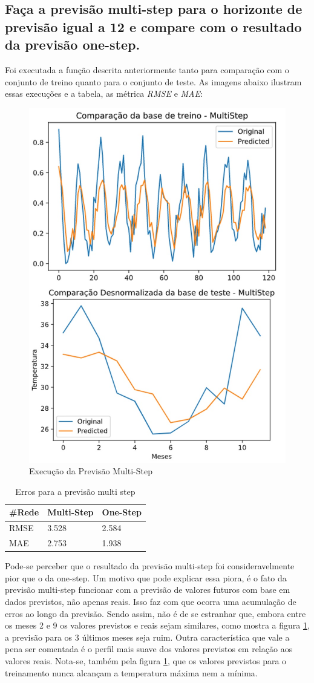 \documentclass[12pt]{article}
\begin{document}
	
	\subsection{Faça a previsão multi-step para o horizonte de previsão igual a 12 e compare com o resultado da previsão one-step.}
	
	Foi executada a função descrita anteriormente tanto para comparação com o conjunto de treino quanto para o conjunto de teste. As imagens abaixo ilustram essas execuções e a tabela, as métrica \textit{RMSE} e \textit{MAE}:
	\begin{figure}[H]
		\centering
		\includegraphics[width=0.5\linewidth]{Imagens/multistep/compMulti.jpg}
		\caption{Execução da Previsão Multi-Step}
		\label{fig:compmulti}
	\end{figure}
	\begin{table}[H]\label{tab:multiErros}
		\begin{tabular}{|l|l|l|}
			\hline
			\#Rede & Multi-Step & One-Step \\ \hline
			RMSE   & 3.528    & 2.584 \\ \hline
			MAE    &  2.753   & 1.938  \\ \hline
		\end{tabular}
		\centering
		\caption{Erros para a previsão multi step}
	\end{table}

	Pode-se perceber que o resultado da previsão multi-step foi consideravelmente pior que o da one-step. Um motivo que pode explicar essa piora, é o fato da previsão multi-step funcionar com a previsão de valores futuros com base em dados previstos, não apenas reais. Isso faz com que ocorra uma acumulação de erros ao longo da previsão. Sendo assim, não é de se estranhar que, embora entre os meses 2 e 9 os valores previstos e reais sejam similares, como mostra a figura \ref{fig:compmulti}, a previsão para os 3 últimos meses seja ruim. Outra característica que vale a pena ser comentada é o perfil mais suave dos valores previstos em relação aos valores reais. Nota-se, também pela figura \ref{fig:compmulti}, que os valores previstos para o treinamento nunca alcançam a temperatura máxima nem a mínima.
	
\end{document}
